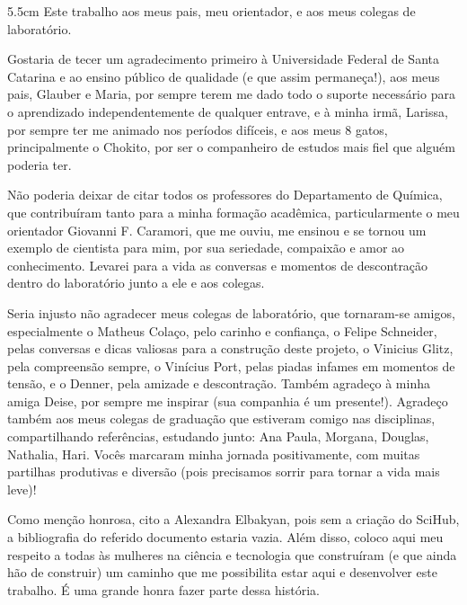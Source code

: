 \begin{dedicatoria}
	\vspace*{\fill}
	\noindent
	\begin{adjustwidth*}{}{5.5cm}     
		Este trabalho aos meus pais, meu orientador, e aos meus colegas de laboratório.
	\end{adjustwidth*}
\end{dedicatoria}

\begin{agradecimentos}
	Gostaria de tecer um agradecimento primeiro à Universidade Federal de Santa Catarina e ao ensino público de qualidade (e que assim permaneça!), aos meus pais, Glauber e Maria, por sempre terem me dado todo o suporte necessário para o aprendizado independentemente de qualquer entrave, e à minha irmã, Larissa, por sempre ter me animado nos períodos difíceis, e aos meus 8 gatos, principalmente o Chokito, por ser o companheiro de estudos mais fiel que alguém poderia ter.

Não poderia deixar de citar todos os professores do Departamento de Química, que contribuíram tanto para a minha formação acadêmica, particularmente o meu orientador Giovanni F. Caramori, que me ouviu, me ensinou e se tornou um exemplo de cientista para mim, por sua seriedade, compaixão e amor ao conhecimento. Levarei para a vida as conversas e momentos de descontração dentro do laboratório junto a ele e aos colegas.

Seria injusto não agradecer meus colegas de laboratório, que tornaram-se amigos, especialmente o Matheus Colaço, pelo carinho e confiança, o Felipe Schneider, pelas conversas e dicas valiosas para a construção deste projeto, o Vinicius Glitz, pela compreensão sempre, o Vinícius Port, pelas piadas infames em momentos de tensão, e o Denner, pela amizade e descontração. Também agradeço à minha amiga Deise, por sempre me inspirar (sua companhia é um presente!). Agradeço também aos meus colegas de graduação que estiveram comigo nas disciplinas, compartilhando referências, estudando junto: Ana Paula, Morgana, Douglas, Nathalia, Hari. Vocês marcaram minha jornada positivamente, com muitas partilhas produtivas e diversão (pois precisamos sorrir para tornar a vida mais leve)!

Como menção honrosa, cito a Alexandra Elbakyan, pois sem a criação do SciHub, a bibliografia do referido documento estaria vazia. Além disso, coloco aqui meu respeito a todas às mulheres na ciência e tecnologia que construíram (e que ainda hão de construir) um caminho que me possibilita estar aqui e desenvolver este trabalho. É uma grande honra fazer parte dessa história.
\end{agradecimentos}

